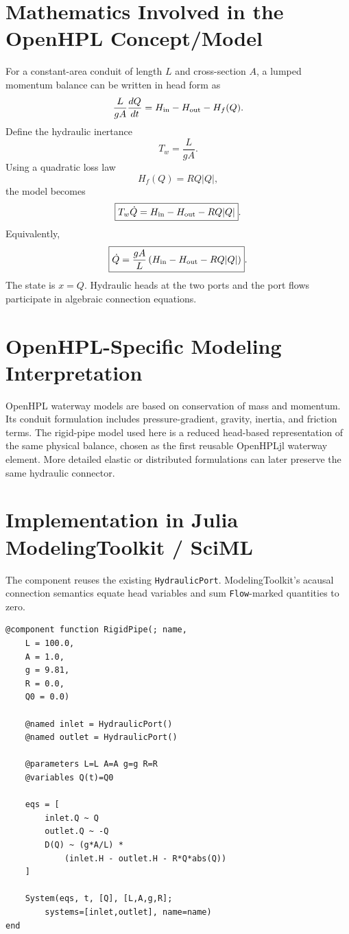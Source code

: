 \documentclass[11pt,a4paper]{article}
\begin{document}
\section{Mathematics Involved in the OpenHPL Concept/Model}
For a constant-area conduit of length $L$ and cross-section $A$, a lumped momentum balance can be written in head form as
\[
\frac{L}{gA}\frac{dQ}{dt}=H_{\rm in}-H_{\rm out}-H_f(Q).
\]
Define the hydraulic inertance
\[
T_w=\frac{L}{gA}.
\]
Using a quadratic loss law
\[
H_f(Q)=R Q|Q|,
\]
the model becomes
\[
\boxed{T_w\dot Q=H_{\rm in}-H_{\rm out}-RQ|Q|}.
\]
Equivalently,
\[
\boxed{\dot Q=\frac{gA}{L}\left(H_{\rm in}-H_{\rm out}-RQ|Q|\right)}.
\]
The state is $x=Q$. Hydraulic heads at the two ports and the port flows participate in algebraic connection equations.

\section{OpenHPL-Specific Modeling Interpretation}
OpenHPL waterway models are based on conservation of mass and momentum. Its conduit formulation includes pressure-gradient, gravity, inertia, and friction terms. The rigid-pipe model used here is a reduced head-based representation of the same physical balance, chosen as the first reusable OpenHPLjl waterway element. More detailed elastic or distributed formulations can later preserve the same hydraulic connector.

\section{Implementation in Julia ModelingToolkit / SciML}
The component reuses the existing \texttt{HydraulicPort}. ModelingToolkit's acausal connection semantics equate head variables and sum \texttt{Flow}-marked quantities to zero.

\begin{lstlisting}
@component function RigidPipe(; name,
    L = 100.0,
    A = 1.0,
    g = 9.81,
    R = 0.0,
    Q0 = 0.0)

    @named inlet = HydraulicPort()
    @named outlet = HydraulicPort()

    @parameters L=L A=A g=g R=R
    @variables Q(t)=Q0

    eqs = [
        inlet.Q ~ Q
        outlet.Q ~ -Q
        D(Q) ~ (g*A/L) *
            (inlet.H - outlet.H - R*Q*abs(Q))
    ]

    System(eqs, t, [Q], [L,A,g,R];
        systems=[inlet,outlet], name=name)
end
\end{lstlisting}
\end{document}
